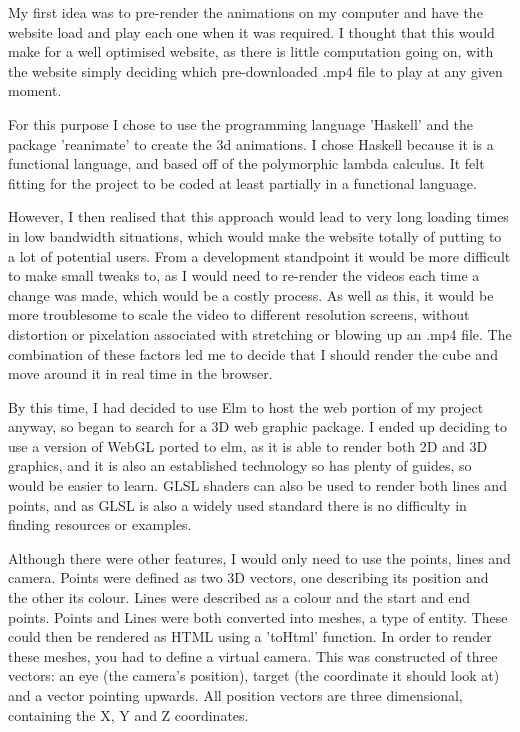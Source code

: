 \documentclass{l4proj}
\begin{document}
My first idea was to pre-render the animations on my computer and have the website load and play each one when it was required.  I thought that this would make for a well optimised website, as there is little computation going on, with the website simply deciding which pre-downloaded .mp4 file to play at any given moment. 

For this purpose I chose to use the programming language 'Haskell' and the package 'reanimate' to create the 3d animations.  I chose Haskell because it is a functional language, and based off of the polymorphic lambda calculus.  It felt fitting for the project to be coded at least partially in a functional language.

However, I then realised that this approach would lead to very long loading times in low bandwidth situations, which would make the website totally of putting to a lot of potential users.  From a development standpoint it would be more difficult to make small tweaks to, as I would need to re-render the videos each time a change was made, which would be a costly process.  As well as this, it would be more troublesome to scale the video to different resolution screens, without distortion or pixelation associated with stretching or blowing up an .mp4 file.  The combination of these factors led me to decide that I should render the cube and move around it in real time in the browser.

By this time, I had decided to use Elm to host the web portion of my project anyway, so began to search for a 3D web graphic package.  I ended up deciding to use a version of WebGL ported to elm, as it is able to render both 2D and 3D graphics, and it is also an established technology so has plenty of guides, so would be easier to learn.  GLSL shaders can also be used to render both lines and points, and as GLSL is also a widely used standard there is no difficulty in finding resources or examples.

Although there were other features, I would only need to use the points, lines and camera.  Points were defined as two 3D vectors, one describing its position and the other its colour.  Lines were described as a colour and the start and end points.  Points and Lines were both converted into meshes, a type of entity.  These could then be rendered as HTML using a 'toHtml' function.  In order to render these meshes, you had to define a virtual camera.  This was constructed of three vectors: an eye (the camera's position), target (the coordinate it should look at) and a vector pointing upwards.  All position vectors are three dimensional, containing the X, Y and Z coordinates.
\end{document}
